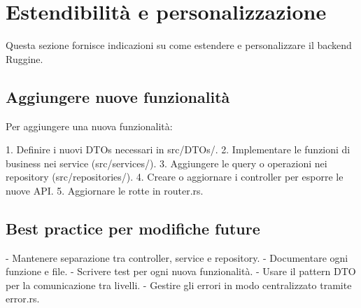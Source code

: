 \chapter{Estendibilità e personalizzazione}

Questa sezione fornisce indicazioni su come estendere e personalizzare il backend Ruggine.

\section{Aggiungere nuove funzionalità}
Per aggiungere una nuova funzionalità:

1. Definire i nuovi DTOs necessari in src/DTOs/.
2. Implementare le funzioni di business nei service (src/services/).
3. Aggiungere le query o operazioni nei repository (src/repositories/).
4. Creare o aggiornare i controller per esporre le nuove API.
5. Aggiornare le rotte in router.rs.

\section{Best practice per modifiche future}
- Mantenere separazione tra controller, service e repository.
- Documentare ogni funzione e file.
- Scrivere test per ogni nuova funzionalità.
- Usare il pattern DTO per la comunicazione tra livelli.
- Gestire gli errori in modo centralizzato tramite error.rs.